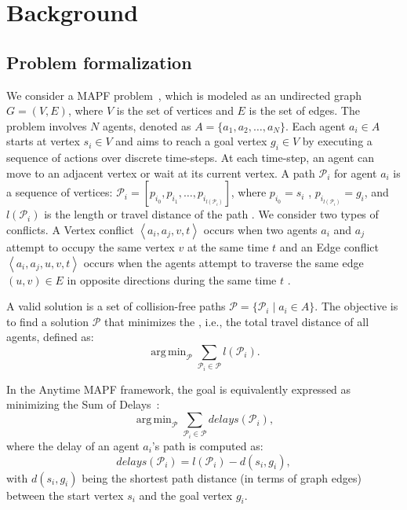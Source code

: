 \documentclass[review]{jair}
\DeclareMathOperator*{\argmin}{arg\,min}
\begin{document}
\section{Background} \label{sec:background}
\subsection{Problem formalization}
We consider a MAPF problem~\citep{SternEtal2019}, which is modeled as an undirected graph $G = (V, E)$, where $V$ is the set of vertices and $E$ is the set of edges. The problem involves $N$ agents, denoted as $A = \{ a_1, a_2, \dots, a_N \}$. 
Each agent $a_i \in A$ starts at vertex $s_i \in V$ and aims to reach a goal vertex $g_i \in V$ by executing a sequence of actions over discrete time-steps. At each time-step, an agent can move to an adjacent vertex or wait at its current vertex. A path \( \mathcal{P}_i \) for agent \( a_i \) is a sequence of vertices: \(\mathcal{P}_i = [p_{i_0}, p_{i_1}, \dots, p_{i_{l(\mathcal{P}_i)}}]\), where  \( p_{i_0} = s_i \) ,  \( p_{i_{l(\mathcal{P}_i)}} = g_i \), and \( l(\mathcal{P}_i) \) is the length or travel distance of the path \citep{LNS}.
We consider two types of conflicts. A Vertex conflict $\left< a_i, a_j, v, t \right>$ occurs when two agents $a_i$ and $a_j$ attempt to occupy the same vertex $v$ at the same time $t$ and an Edge conflict $\left< a_i, a_j, u, v, t \right>$ occurs when the agents attempt to traverse the same edge $(u,v) \in E$ in opposite directions during the same time $t$ \citep{Stern2019}.

A valid solution is a set of collision-free paths $\mathcal{P} = \{\mathcal{P}_i \mid a_i \in A \}$. The objective is to find a solution $\mathcal{P}$ that minimizes the , i.e., the total travel distance of all agents, defined as:  
\begin{equation}
    \argmin_\mathcal{P} \sum_{\mathcal{P}_i \in \mathcal{P}} l(\mathcal{P}_i).
\end{equation}

In the Anytime MAPF framework, the goal is equivalently expressed as minimizing the Sum of Delays~\citep{LNS}:
\begin{equation}
\argmin_\mathcal{P} \sum_{\mathcal{P}_i \in \mathcal{P}} delays(\mathcal{P}_i),
\end{equation}
where the delay of an agent $a_i$'s path is computed as:
\begin{equation}
delays(\mathcal{P}_i) = l(\mathcal{P}_i) - d(s_i, g_i),
\end{equation}
with $d(s_i, g_i)$ being the shortest path distance (in terms of graph edges) between the start vertex $s_i$ and the goal vertex $g_i$.
\end{document}
